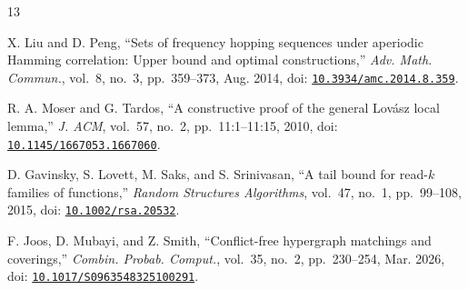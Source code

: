 \documentclass[12pt,letterpaper,onecolumn]{article}
\theoremstyle{definition}
\begin{document}
\begin{thebibliography}{13}

X. Liu and D. Peng, ``Sets of frequency hopping sequences under aperiodic Hamming correlation: Upper bound and optimal constructions,'' \emph{Adv. Math. Commun.}, vol.~8, no.~3, pp.~359--373, Aug. 2014, doi: \href{https://doi.org/10.3934/amc.2014.8.359}{\nolinkurl{10.3934/amc.2014.8.359}}.

R. A. Moser and G. Tardos, ``A constructive proof of the general Lov\'asz local lemma,'' \emph{J. ACM}, vol.~57, no.~2, pp.~11:1--11:15, 2010, doi: \href{https://doi.org/10.1145/1667053.1667060}{\nolinkurl{10.1145/1667053.1667060}}.

D. Gavinsky, S. Lovett, M. Saks, and S. Srinivasan, ``A tail bound for read-$k$ families of functions,'' \emph{Random Structures Algorithms}, vol.~47, no.~1, pp.~99--108, 2015, doi: \href{https://doi.org/10.1002/rsa.20532}{\nolinkurl{10.1002/rsa.20532}}.

F. Joos, D. Mubayi, and Z. Smith, ``Conflict-free hypergraph matchings and coverings,'' \emph{Combin. Probab. Comput.}, vol.~35, no.~2, pp.~230--254, Mar. 2026, doi: \href{https://doi.org/10.1017/S0963548325100291}{\nolinkurl{10.1017/S0963548325100291}}.
\end{thebibliography}
\end{document}
